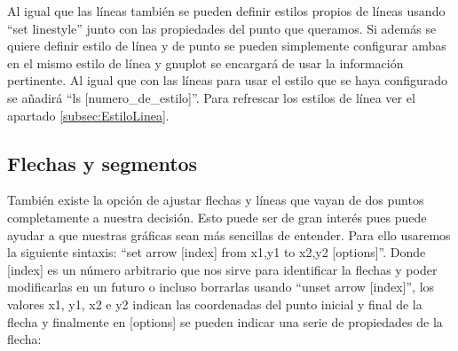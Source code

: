 \documentclass[11pt,a4paper,twoside,pdf]{article}
\numberwithin{equation}{section}
\begin{document}
Al igual que las líneas también se pueden definir estilos propios de líneas usando ``set linestyle'' junto con las propiedades del punto que queramos. Si además se quiere definir estilo de línea y de punto se pueden simplemente configurar ambas en el mismo estilo de línea y gnuplot se encargará de usar la información pertinente. Al igual que con las líneas para usar el estilo que se haya configurado se añadirá ``ls [numero\_de\_estilo]''. Para refrescar los estilos de línea ver el apartado \ref{subsec:EstiloLinea}.

\subsection{Flechas y segmentos}

También existe la opción de ajustar flechas y líneas que vayan de dos puntos completamente a nuestra decisión. Esto puede ser de gran interés pues puede ayudar a que nuestras gráficas sean más sencillas de entender. Para ello usaremos la siguiente sintaxis: ``set arrow [index] from x1,y1 to x2,y2 [options]''. Donde [index] es un número arbitrario que nos sirve para identificar la flechas y poder modificarlas en un futuro o incluso borrarlas usando ``unset arrow [index]'', los valores x1, y1, x2 e y2 indican las coordenadas del punto inicial y final de la flecha y finalmente en [options] se pueden indicar una serie de propiedades de la flecha:
\end{document}
